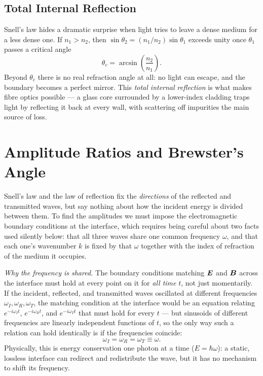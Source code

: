 \subsection{Total Internal Reflection}
\label{sec:tir}

Snell's law hides a dramatic surprise when light tries to leave a dense medium for a less dense one. If $n_1 > n_2$, then $\sin\theta_2 = (n_1/n_2)\sin\theta_1$ exceeds unity once $\theta_1$ passes a critical angle
\begin{equation}
    \theta_c = \arcsin\!\left(\frac{n_2}{n_1}\right).
\end{equation}
Beyond $\theta_c$ there is no real refraction angle at all: no light can escape, and the boundary becomes a perfect mirror. This \emph{total internal reflection} is what makes fibre optics possible --- a glass core surrounded by a lower-index cladding traps light by reflecting it back at every wall, with scattering off impurities the main source of loss.

\section{Amplitude Ratios and Brewster's Angle}

Snell's law and the law of reflection fix the \emph{directions} of the reflected and transmitted waves, but say nothing about how the incident energy is divided between them. To find the amplitudes we must impose the electromagnetic boundary conditions at the interface, which requires being careful about two facts used silently below: that all three waves share one common frequency $\omega$, and that each one's wavenumber $k$ is fixed by that $\omega$ together with the index of refraction of the medium it occupies.

\emph{Why the frequency is shared.} The boundary conditions matching $\vect{E}$ and $\vect{B}$ across the interface must hold at every point on it for \emph{all time} $t$, not just momentarily. If the incident, reflected, and transmitted waves oscillated at different frequencies $\omega_I,\omega_R,\omega_T$, the matching condition at the interface would be an equation relating $e^{-i\omega_I t}$, $e^{-i\omega_R t}$, and $e^{-i\omega_T t}$ that must hold for every $t$ --- but sinusoids of different frequencies are linearly independent functions of $t$, so the only way such a relation can hold identically is if the frequencies coincide:
\[
\omega_I = \omega_R = \omega_T \equiv \omega.
\]
Physically, this is energy conservation one photon at a time ($E = \hbar\omega$): a static, lossless interface can redirect and redistribute the wave, but it has no mechanism to shift its frequency.

